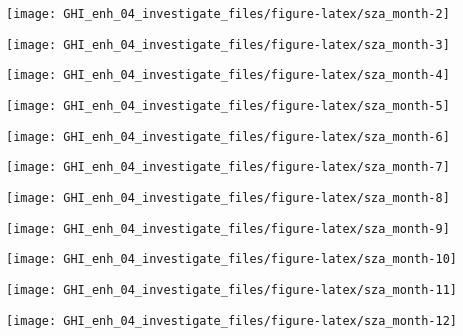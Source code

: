 \documentclass[
  10pt,
  a4paper,oneside]{article}
\begin{document}
\begin{center}\texttt{[image: GHI\_enh\_04\_investigate\_files/figure-latex/sza\_month-2]} \end{center}

\begin{center}\texttt{[image: GHI\_enh\_04\_investigate\_files/figure-latex/sza\_month-3]} \end{center}

\begin{center}\texttt{[image: GHI\_enh\_04\_investigate\_files/figure-latex/sza\_month-4]} \end{center}

\begin{center}\texttt{[image: GHI\_enh\_04\_investigate\_files/figure-latex/sza\_month-5]} \end{center}

\begin{center}\texttt{[image: GHI\_enh\_04\_investigate\_files/figure-latex/sza\_month-6]} \end{center}

\begin{center}\texttt{[image: GHI\_enh\_04\_investigate\_files/figure-latex/sza\_month-7]} \end{center}

\begin{center}\texttt{[image: GHI\_enh\_04\_investigate\_files/figure-latex/sza\_month-8]} \end{center}

\begin{center}\texttt{[image: GHI\_enh\_04\_investigate\_files/figure-latex/sza\_month-9]} \end{center}

\begin{center}\texttt{[image: GHI\_enh\_04\_investigate\_files/figure-latex/sza\_month-10]} \end{center}

\begin{center}\texttt{[image: GHI\_enh\_04\_investigate\_files/figure-latex/sza\_month-11]} \end{center}

\begin{center}\texttt{[image: GHI\_enh\_04\_investigate\_files/figure-latex/sza\_month-12]} \end{center}
\end{document}
